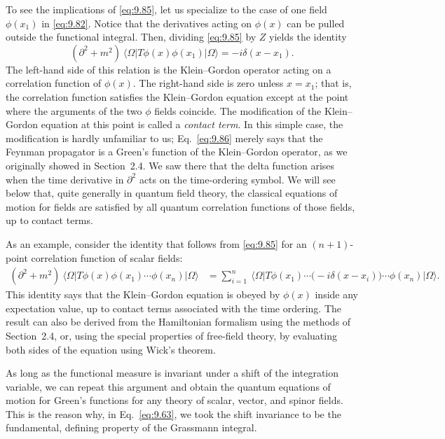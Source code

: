 To see the implications of \eqref{eq:9.85}, let us specialize to the case of
one field $\phi(x_1)$ in \eqref{eq:9.82}.  Notice that the derivatives acting
on $\phi(x)$ can be pulled outside the functional integral.  Then, dividing
\eqref{eq:9.85} by $Z$ yields the identity
\begin{equation}
  (\partial^2 + m^2)\ \langle\Omega|T\phi(x)\phi(x_1)|\Omega\rangle
  = -i\delta(x-x_1) .
  \label{eq:9.86}
\end{equation}
The left-hand side of this relation is the Klein--Gordon operator acting on a
correlation function of $\phi(x)$.  The right-hand side is zero unless
$x = x_1$; that is, the correlation function satisfies the Klein--Gordon
equation except at the point where the arguments of the two $\phi$ fields
coincide.  The modification of the Klein--Gordon equation at this point is
called a \emph{contact term}.  In this simple case, the modification is hardly
unfamiliar to us; Eq.~\eqref{eq:9.86} merely says that the Feynman propagator
is a Green's function of the Klein--Gordon operator, as we originally showed
in Section~2.4.  We saw there that the delta function arises when the time
derivative in $\partial^2$ acts on the time-ordering symbol.  We will see below
that, quite generally in quantum field theory, the classical equations of
motion for fields are satisfied by all quantum correlation functions of those
fields, up to contact terms.

As an example, consider the identity that follows from \eqref{eq:9.85} for an
$(n+1)$-point correlation function of scalar fields:
\begin{equation}
  \begin{aligned}
    (\partial^2+m^2)\ \langle\Omega|T\phi(x)\phi(x_1)\cdots\phi(x_n)
      |\Omega\rangle
    &= \sum_{i=1}^{n}\ \langle\Omega|T\phi(x_1)\cdots\bigl(
      -i\delta(x-x_i) \bigr)\cdots\phi(x_n)|\Omega\rangle .
  \end{aligned}
  \label{eq:9.87}
\end{equation}
This identity says that the Klein--Gordon equation is obeyed by $\phi(x)$
inside any expectation value, up to contact terms associated with the time
ordering.  The result can also be derived from the Hamiltonian formalism using
the methods of Section~2.4, or, using the special properties of free-field
theory, by evaluating both sides of the equation using Wick's theorem.

As long as the functional measure is invariant under a shift of the
integration variable, we can repeat this argument and obtain the quantum
equations of motion for Green's functions for any theory of scalar, vector,
and spinor fields.  This is the reason why, in Eq.~\eqref{eq:9.63}, we took
the shift invariance to be the fundamental, defining property of the Grassmann
integral.

